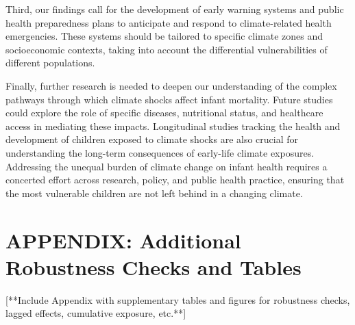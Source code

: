 \documentclass[12pt]{article}
\begin{document}
Third, our findings call for the development of early warning systems and public health preparedness plans to anticipate and respond to climate-related health emergencies.  These systems should be tailored to specific climate zones and socioeconomic contexts, taking into account the differential vulnerabilities of different populations.

Finally, further research is needed to deepen our understanding of the complex pathways through which climate shocks affect infant mortality.  Future studies could explore the role of specific diseases, nutritional status, and healthcare access in mediating these impacts.  Longitudinal studies tracking the health and development of children exposed to climate shocks are also crucial for understanding the long-term consequences of early-life climate exposures.  Addressing the unequal burden of climate change on infant health requires a concerted effort across research, policy, and public health practice, ensuring that the most vulnerable children are not left behind in a changing climate.


\printbibliography

\clearpage
\appendix

\section{APPENDIX: Additional Robustness Checks and Tables}

[**Include Appendix with supplementary tables and figures for robustness checks, lagged effects, cumulative exposure, etc.**]
\end{document}

